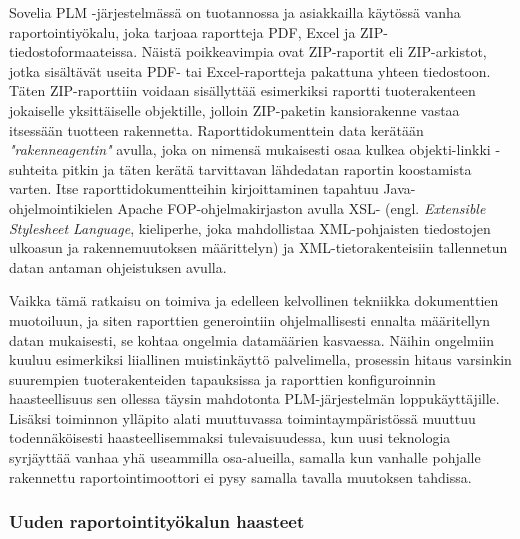 Sovelia PLM -järjestelmässä on tuotannossa ja asiakkailla käytössä vanha raportointiyökalu, joka tarjoaa raportteja PDF, Excel ja ZIP-tiedostoformaateissa. Näistä poikkeavimpia ovat ZIP-raportit eli ZIP-arkistot,  jotka sisältävät useita PDF- tai Excel-raportteja pakattuna yhteen tiedostoon. Täten ZIP-raporttiin voidaan sisällyttää esimerkiksi raportti tuoterakenteen jokaiselle yksittäiselle objektille, jolloin ZIP-paketin kansiorakenne vastaa itsessään tuotteen rakennetta. Raporttidokumenttein data kerätään \textit{"rakenneagentin"} avulla, joka on nimensä mukaisesti osaa kulkea objekti-linkki -suhteita pitkin ja täten kerätä tarvittavan lähdedatan raportin koostamista varten. Itse raporttidokumentteihin kirjoittaminen tapahtuu Java-ohjelmointikielen Apache FOP-ohjelmakirjaston \cite{noauthor_apachetm_nodate} avulla XSL- (engl. \textit{Extensible Stylesheet Language}, kieliperhe, joka mahdollistaa XML-pohjaisten tiedostojen ulkoasun ja rakennemuutoksen määrittelyn) ja XML-tietorakenteisiin tallennetun datan antaman ohjeistuksen avulla.

Vaikka tämä ratkaisu on toimiva ja edelleen kelvollinen tekniikka dokumenttien muotoiluun, ja siten raporttien generointiin ohjelmallisesti ennalta määritellyn datan mukaisesti, se kohtaa ongelmia datamäärien kasvaessa. Näihin ongelmiin kuuluu esimerkiksi liiallinen muistinkäyttö palvelimella, prosessin hitaus varsinkin suurempien tuoterakenteiden tapauksissa ja raporttien konfiguroinnin haasteellisuus sen ollessa täysin mahdotonta PLM-järjestelmän loppukäyttäjille. Lisäksi toiminnon ylläpito alati muuttuvassa toimintaympäristössä muuttuu todennäköisesti haasteellisemmaksi tulevaisuudessa, kun uusi teknologia syrjäyttää vanhaa yhä useammilla osa-alueilla, samalla kun vanhalle pohjalle rakennettu raportointimoottori ei pysy samalla tavalla muutoksen tahdissa.

\subsubsection{Uuden raportointityökalun haasteet} \label{Uuden haasteet}

